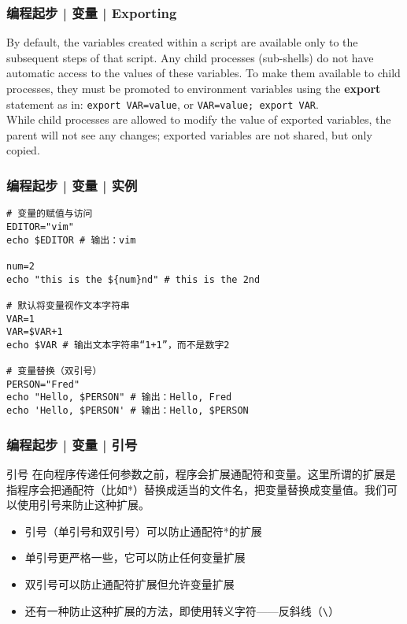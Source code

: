 \begin{frame}[fragile]
  \frametitle{编程起步 | 变量 | Exporting}
  By default, the variables created within a script are available only to the subsequent steps of that script. Any child processes (sub-shells) do not have automatic access to the values of these variables. To make them available to child processes, they must be promoted to environment variables using the \textbf{export} statement as in: \verb|export VAR=value|, or \verb|VAR=value; export VAR|.\\
  \vspace{0.2cm}
  While child processes are allowed to modify the value of exported variables, the parent will not see any changes; exported variables are not shared, but only copied.
\end{frame}

\begin{frame}[fragile]
  \frametitle{编程起步 | 变量 | \alert{实例}}
  \vspace{-0.5em}
\begin{lstlisting}
# 变量的赋值与访问
EDITOR="vim"
echo $EDITOR # 输出：vim

num=2
echo "this is the ${num}nd" # this is the 2nd

# 默认将变量视作文本字符串
VAR=1
VAR=$VAR+1
echo $VAR # 输出文本字符串“1+1”，而不是数字2

# 变量替换（双引号）
PERSON="Fred"
echo "Hello, $PERSON" # 输出：Hello, Fred
echo 'Hello, $PERSON' # 输出：Hello, $PERSON
\end{lstlisting}
\end{frame}

\begin{frame}[fragile]
  \frametitle{编程起步 | 变量 | \alert{引号}}
  \begin{block}{引号}
    在向程序传递任何参数之前，程序会扩展通配符和变量。这里所谓的扩展是指程序会把通配符（比如*）替换成适当的文件名，把变量替换成变量值。我们可以使用引号来防止这种扩展。
    \begin{itemize}
      \item 引号（单引号和双引号）可以防止通配符*的扩展
      \item 单引号更严格一些，它可以防止任何变量扩展
      \item 双引号可以防止通配符扩展但允许变量扩展
      \item 还有一种防止这种扩展的方法，即使用转义字符——反斜线（\verb|\|）
    \end{itemize}
  \end{block}
\end{frame}

